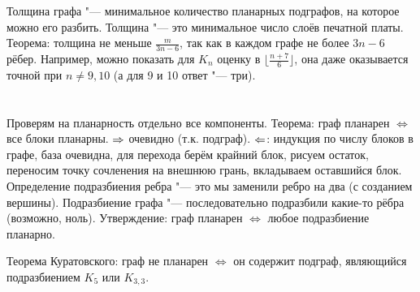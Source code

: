 	Толщина графа "--- минимальное количество планарных подграфов, на которое можно его разбить.
	Толщина "--- это минимальное число слоёв печатной платы.
	Теорема: толщина не меньше $\frac{m}{3n-6}$, так как в каждом графе не более $3n-6$ рёбер.
	Например, можно показать для $K_n$ оценку в $\lfloor\frac{n+7}{6}\rfloor$, она даже оказывается точной при $n \neq 9,10$
	(а для 9 и 10 ответ "--- три).

\section{} %
	Проверям на планарность отдельно все компоненты.
	Теорема: граф планарен $\iff$ все блоки планарны.
	$\Rightarrow$ очевидно (т.к. подграф).
	$\Leftarrow$: индукция по числу блоков в графе, база очевидна, для перехода берём крайний блок, рисуем остаток, переносим точку сочленения на внешнюю грань, вкладываем оставшийся блок.
	Определение подразбиения ребра "--- это мы заменили ребро на два (с созданием вершины).
	Подразбиение графа "--- последовательно подразбили какие-то рёбра (возможно, ноль).
	Утверждение: граф планарен $\iff$ любое подразбиение планарно.

	Теорема Куратовского: граф не планарен $\iff$ он содержит подграф, являющийся подразбиением $K_5$ или $K_{3,3}$.
	\TODO
